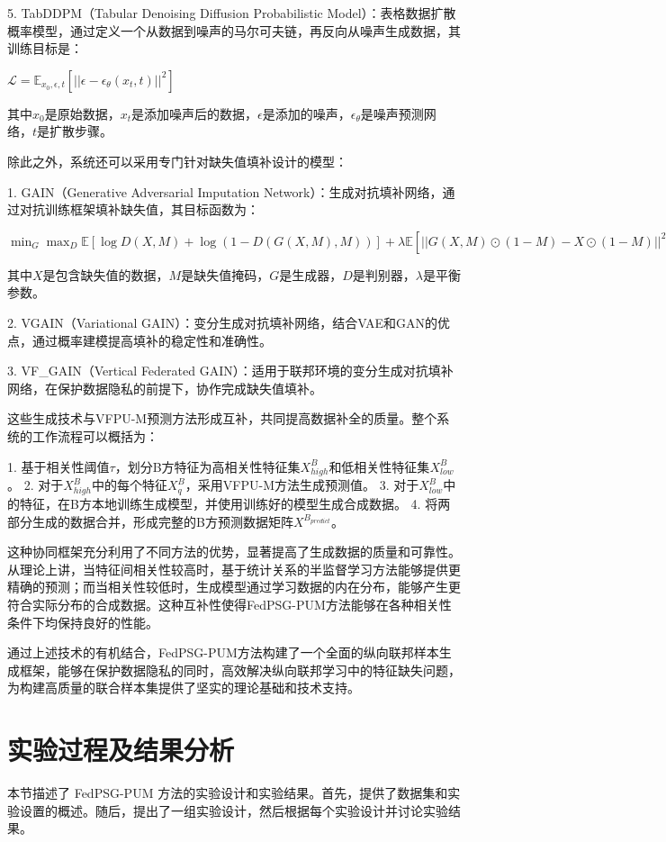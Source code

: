 5. TabDDPM（Tabular Denoising Diffusion Probabilistic Model）：表格数据扩散概率模型，通过定义一个从数据到噪声的马尔可夫链，再反向从噪声生成数据，其训练目标是：

$\mathcal{L} = \mathbb{E}_{x_0, \epsilon, t}[||\epsilon - \epsilon_\theta(x_t, t)||^2]$

其中$x_0$是原始数据，$x_t$是添加噪声后的数据，$\epsilon$是添加的噪声，$\epsilon_\theta$是噪声预测网络，$t$是扩散步骤。

除此之外，系统还可以采用专门针对缺失值填补设计的模型：

1. GAIN（Generative Adversarial Imputation Network）：生成对抗填补网络，通过对抗训练框架填补缺失值，其目标函数为：

$\min_G \max_D \mathbb{E}[\log D(X, M) + \log(1 - D(G(X, M), M))] + \lambda \mathbb{E}[||G(X, M) \odot (1-M) - X \odot (1-M)||^2]$

其中$X$是包含缺失值的数据，$M$是缺失值掩码，$G$是生成器，$D$是判别器，$\lambda$是平衡参数。

2. VGAIN（Variational GAIN）：变分生成对抗填补网络，结合VAE和GAN的优点，通过概率建模提高填补的稳定性和准确性。

3. VF\_GAIN（Vertical Federated GAIN）：适用于联邦环境的变分生成对抗填补网络，在保护数据隐私的前提下，协作完成缺失值填补。

这些生成技术与VFPU-M预测方法形成互补，共同提高数据补全的质量。整个系统的工作流程可以概括为：

1. 基于相关性阈值$\tau$，划分B方特征为高相关性特征集$X^B_{high}$和低相关性特征集$X^B_{low}$。
2. 对于$X^B_{high}$中的每个特征$X^B_q$，采用VFPU-M方法生成预测值。
3. 对于$X^B_{low}$中的特征，在B方本地训练生成模型，并使用训练好的模型生成合成数据。
4. 将两部分生成的数据合并，形成完整的B方预测数据矩阵$X^{B_{predict}}$。

这种协同框架充分利用了不同方法的优势，显著提高了生成数据的质量和可靠性。从理论上讲，当特征间相关性较高时，基于统计关系的半监督学习方法能够提供更精确的预测；而当相关性较低时，生成模型通过学习数据的内在分布，能够产生更符合实际分布的合成数据。这种互补性使得FedPSG-PUM方法能够在各种相关性条件下均保持良好的性能。

通过上述技术的有机结合，FedPSG-PUM方法构建了一个全面的纵向联邦样本生成框架，能够在保护数据隐私的同时，高效解决纵向联邦学习中的特征缺失问题，为构建高质量的联合样本集提供了坚实的理论基础和技术支持。


\section{实验过程及结果分析}
本节描述了 FedPSG-PUM 方法的实验设计和实验结果。首先，提供了数据集和实验设置的概述。随后，提出了一组实验设计，然后根据每个实验设计并讨论实验结果。
